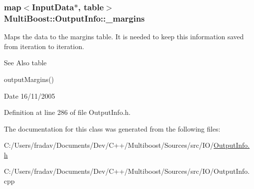 \hypertarget{classMultiBoost_1_1OutputInfo_a350f1c9355d0602ec20c99ed70491e85}{
\subsubsection[{\-\_\-margins}]{\setlength{\rightskip}{0pt plus 5cm}map$<${\bf Input\-Data}$\ast$, table$>$ Multi\-Boost\-::\-Output\-Info\-::\-\_\-margins\hspace{0.3cm}{\ttfamily [protected]}}}\label{classMultiBoost_1_1OutputInfo_a350f1c9355d0602ec20c99ed70491e85}
Maps the data to the margins table. It is needed to keep this information saved from iteration to iteration. \begin{DoxySeeAlso}{See Also}
table 

output\-Margins() 
\end{DoxySeeAlso}
\begin{DoxyDate}{Date}
16/11/2005 
\end{DoxyDate}


Definition at line 286 of file Output\-Info.\-h.



The documentation for this class was generated from the following files\-:\begin{DoxyCompactItemize}
\item 
C\-:/\-Users/fradav/\-Documents/\-Dev/\-C++/\-Multiboost/\-Sources/src/\-I\-O/\hyperlink{OutputInfo_8h}{Output\-Info.\-h}\item 
C\-:/\-Users/fradav/\-Documents/\-Dev/\-C++/\-Multiboost/\-Sources/src/\-I\-O/Output\-Info.\-cpp\end{DoxyCompactItemize}
